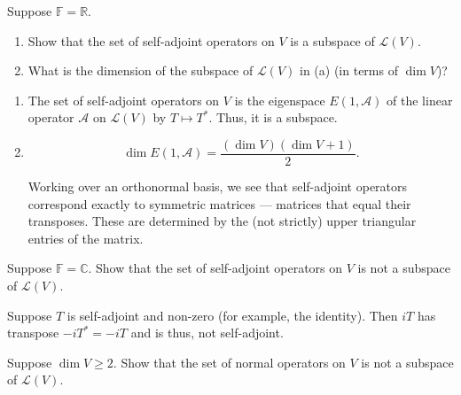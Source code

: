\documentclass[12 pt, letterpaper]{hmcpset}
\begin{document}
\pagebreak

\begin{problem}[16]
	Suppose $\mathbb{F} = \mathbb{R}$.
	\begin{enumerate}
		\item Show that the set of self-adjoint operators on $V$ is a subspace of $\mathcal{L}(V)$.
		\item What is the dimension of the subspace of $\mathcal{L}(V)$ in (a) (in terms of $\dim V$)?
	\end{enumerate}
\end{problem}

\begin{solution}
	\begin{enumerate}
		\item The set of self-adjoint operators on $V$ is the eigenspace $E(1, \mathcal{A})$ of the linear operator $\mathcal{A}$ on $\mathcal{L}(V)$ by $T \mapsto T^{*}$. Thus, it is a subspace.
		\item
			\[
				\boxed{
					\dim E(1, \mathcal{A}) = \frac{(\dim V)(\dim V + 1)}{2}.
				}
			\]

			Working over an orthonormal basis, we see that self-adjoint operators correspond exactly to symmetric matrices --- matrices that equal their transposes. These are determined by the (not strictly) upper triangular entries of the matrix.
	\end{enumerate}
\end{solution}

\pagebreak

\begin{problem}[17]
	Suppose $\mathbb{F} = \mathbb{C}$. Show that the set of self-adjoint operators on $V$ is not a subspace of $\mathcal{L}(V)$.
\end{problem}

\begin{solution}
	Suppose $T$ is self-adjoint and non-zero (for example, the identity). Then $i T$ has transpose $- i T^{*} = - i T$ and is thus, not self-adjoint. 
\end{solution}

\pagebreak

\begin{problem}[18]
	Suppose $\dim V \ge 2$. Show that the set of normal operators on $V$ is not a subspace of $\mathcal{L}(V)$.
\end{problem}
\end{document}

